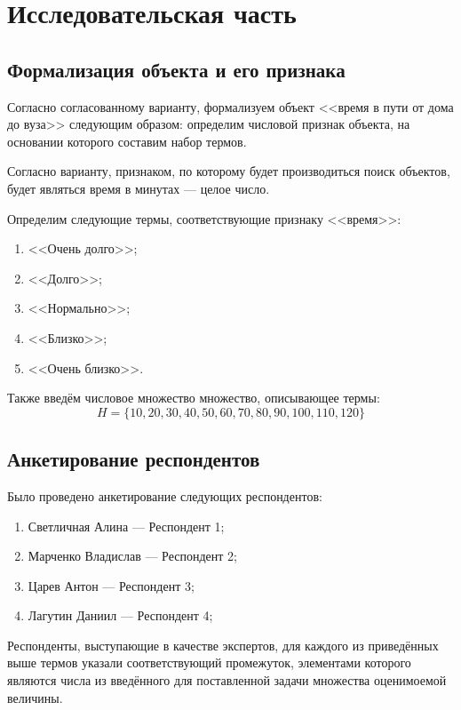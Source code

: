 \chapter{Исследовательская часть}

\section{Формализация объекта и его признака}
\label{formal}
Согласно согласованному варианту, формализуем объект <<время в пути от дома до вуза>> следующим образом: определим числовой признак объекта, на основании которого составим набор термов.

Согласно варианту, признаком, по которому будет производиться поиск объектов, будет являться время в минутах --- целое число.

Определим следующие термы, соответствующие признаку <<время>>:
\begin{enumerate}[label=\arabic*), itemindent=1em]
	\item <<Очень долго>>;
	\item <<Долго>>;
	\item <<Нормально>>;
	\item <<Близко>>;
	\item <<Очень близко>>.
\end{enumerate}

Также введём числовое множество множество, описывающее термы:
\begin{equation}
	\label{eq:h}
	H = \{10, 20, 30, 40, 50,60,70,80,90,100,110,120\}
\end{equation}
\newpage
\section{Анкетирование респондентов}

Было проведено анкетирование следующих респондентов:
\begin{enumerate}[label=\arabic*), itemindent=1em]
	\item Светличная Алина --- Респондент 1;
	\item Марченко Владислав --- Респондент 2;
	\item Царев Антон --- Респондент 3;
	\item Лагутин Даниил --- Респондент 4;
\end{enumerate}

Респонденты, выступающие в качестве экспертов, для каждого из приведённых выше термов указали соответствующий промежуток, элементами которого являются числа из введённого для поставленной задачи множества оценимоемой величины.

